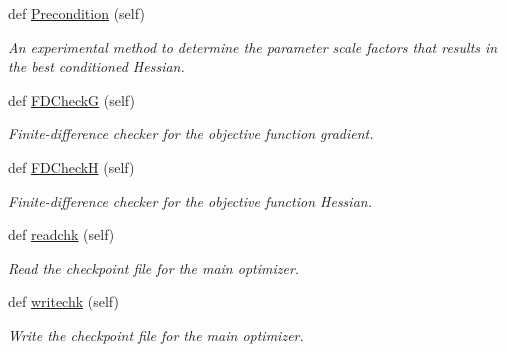\begin{DoxyCompactItemize}
def \hyperlink{classsrc_1_1optimizer_1_1Optimizer_a372e02cecc05914c0fea61baf5ea2b28}{Precondition} (self)
\begin{DoxyCompactList}\small\item\em An experimental method to determine the parameter scale factors that results in the best conditioned Hessian. \end{DoxyCompactList}\item 
def \hyperlink{classsrc_1_1optimizer_1_1Optimizer_aca89ff4f0813ce420ea0dcaab14c22d9}{F\+D\+CheckG} (self)
\begin{DoxyCompactList}\small\item\em Finite-\/difference checker for the objective function gradient. \end{DoxyCompactList}\item 
def \hyperlink{classsrc_1_1optimizer_1_1Optimizer_a9e68121016fa389cc2517d05e4286a6e}{F\+D\+CheckH} (self)
\begin{DoxyCompactList}\small\item\em Finite-\/difference checker for the objective function Hessian. \end{DoxyCompactList}\item 
def \hyperlink{classsrc_1_1optimizer_1_1Optimizer_ab57aa047acdc3aedfbe0f292c80e3d18}{readchk} (self)
\begin{DoxyCompactList}\small\item\em Read the checkpoint file for the main optimizer. \end{DoxyCompactList}\item 
def \hyperlink{classsrc_1_1optimizer_1_1Optimizer_a30bd3b593b783f2e49e15d84d45927c3}{writechk} (self)
\begin{DoxyCompactList}\small\item\em Write the checkpoint file for the main optimizer. \end{DoxyCompactList}\end{DoxyCompactItemize}
